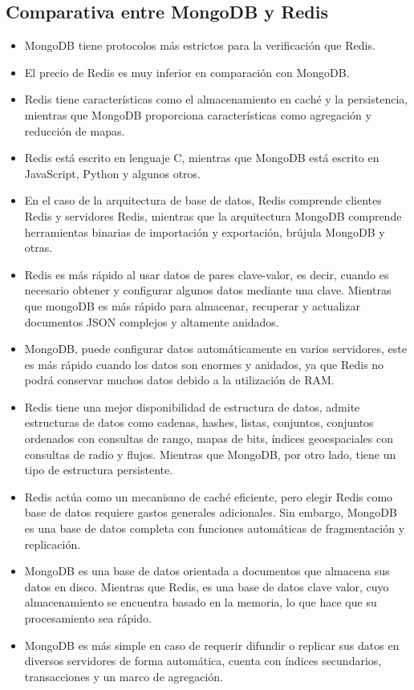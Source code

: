 \documentclass[twoside,twocolumn]{article}
\begin{document}
\subsection{Comparativa entre MongoDB y Redis}
\begin{itemize}
    \item   MongoDB tiene protocolos más estrictos para la verificación que Redis.
	\item   El precio de Redis es muy inferior en comparación con MongoDB.
	\item   Redis tiene características como el almacenamiento en caché y la persistencia, mientras que MongoDB proporciona características como agregación y reducción de mapas.
	\item   Redis está escrito en lenguaje C, mientras que MongoDB está escrito en JavaScript, Python y algunos otros.
	\item   En el caso de la arquitectura de base de datos, Redis comprende clientes Redis y servidores Redis, mientras que la arquitectura MongoDB comprende herramientas binarias de importación y exportación, brújula MongoDB y otras.
	\item   Redis es más rápido al usar datos de pares clave-valor, es decir, cuando es necesario obtener y configurar algunos datos mediante una clave. Mientras que mongoDB es más rápido para almacenar, recuperar y actualizar documentos JSON complejos y altamente anidados.
	\item   MongoDB, puede configurar datos automáticamente en varios servidores, este es más rápido cuando los datos son enormes y anidados, ya que Redis no podrá conservar muchos datos debido a la utilización de RAM.
	\item   Redis tiene una mejor disponibilidad de estructura de datos, admite estructuras de datos como cadenas, hashes, listas, conjuntos, conjuntos ordenados con consultas de rango, mapas de bits, índices geoespaciales con consultas de radio y flujos. Mientras que MongoDB, por otro lado, tiene un tipo de estructura persistente.
	\item   Redis actúa como un mecanismo de caché eficiente, pero elegir Redis como base de datos requiere gastos generales adicionales. Sin embargo, MongoDB es una base de datos completa con funciones automáticas de fragmentación y replicación.
	\item   MongoDB es una base de datos orientada a documentos que almacena sus datos en disco. Mientras que Redis, es una base de datos clave valor, cuyo almacenamiento se encuentra basado en la memoria, lo que hace que su procesamiento sea rápido.
	\item   MongoDB es más simple en caso de requerir difundir o replicar sus datos en diversos servidores de forma automática, cuenta con índices secundarios, transacciones y un marco de agregación.

\end{itemize}
\end{document}
